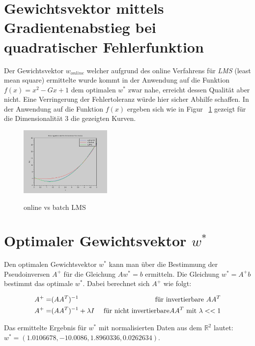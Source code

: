 \documentclass[]{report}
\begin{document}
\section{Gewichtsvektor mittels Gradientenabstieg bei quadratischer Fehlerfunktion}

Der Gewichtsvektor $w_{online}$ welcher aufgrund des online Verfahrens f\"ur \emph{LMS} (least mean square) ermittelte wurde kommt in der Anwendung auf die Funktion $f(x)=x^2-Gx+1$ dem optimalen $w^*$ zwar nahe, erreicht dessen Qualit\"at aber nicht. Eine Verringerung der Fehlertoleranz w\"urde hier sicher Abhilfe schaffen.
In der Anwendung auf die Funktion $f(x)$ ergeben sich wie in Figur ~\ref{fig:onlineVsBatchLMS} gezeigt f\"ur die Dimensionalit\"at $3$ die gezeigten Kurven.
  
\begin{figure}[h]
\centering
\includegraphics[width=0.4\textwidth]{./images/OnlineVsBatchLMS.png} \\
\caption{online vs batch LMS}
\label{fig:onlineVsBatchLMS}
\end{figure}  

\section{Optimaler Gewichtsvektor $w^*$}

Den optimalen Gewichtsvektor $w^*$ kann man \"uber die Bestimmung der Pseudoinversen $A^+$ f\"ur die Gleichung $Aw^*=b$ ermitteln.
Die Gleichung $w^*=A^+b$ bestimmt das optimale $w^*$. 
Dabei berechnet sich $A^+$ wie folgt:

\begin{eqnarray}
A^+ =& (AA^T)^{-1} &\textnormal{ f\"ur invertierbare } AA^T \\
A^+ =& (AA^T)^{-1} + \lambda I &\textnormal{ f\"ur nicht invertierbare} AA^T \textnormal{ mit } \lambda<<1
\end{eqnarray}

Das ermittelte Ergebnis f\"ur $w^*$ mit normalisierten Daten aus dem $\mathbb{R}^2$ lautet: $w^*=(1.0106678, - 10.0086, 1.8960336, 0.0262634)$.
\end{document}
